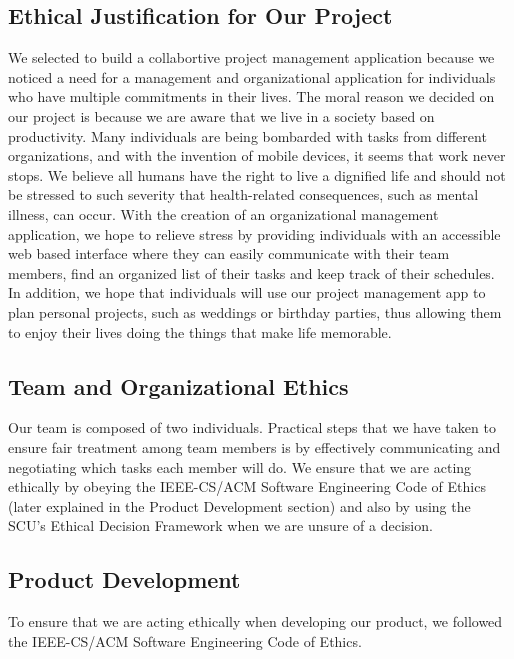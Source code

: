 \subsection{Ethical Justification for Our Project}
 We selected to build a collabortive project management application because we noticed a need for a management and organizational application for individuals who have multiple commitments in their lives. The moral reason we decided on our project is because we are aware that we live in a society based on productivity. Many individuals are being bombarded with tasks from different organizations, and with the invention of mobile devices, it seems that work never stops. We believe all humans have the right to live a dignified life and should not be stressed to such severity that health-related consequences, such as mental illness, can occur. With the creation of an organizational management application, we hope to relieve stress by providing individuals with an accessible web based interface where they can easily communicate with their team members, find an organized list of their tasks and keep track of their schedules. In addition, we hope that individuals will use our project management app to plan personal projects, such as weddings or birthday parties, thus allowing them to enjoy their lives doing the things that make life memorable. 
 \subsection{Team and Organizational Ethics}
 Our team is composed of two individuals. Practical steps that we have taken to ensure fair treatment among team members is by effectively communicating and negotiating which tasks each member will do. We ensure that we are acting ethically by obeying the IEEE-CS/ACM Software Engineering Code of Ethics (later explained in the Product Development section) and also by using the SCU’s Ethical Decision Framework when we are unsure of a decision. 
 \subsection{Product Development} 
To ensure that we are acting ethically when developing our product, we followed the  IEEE-CS/ACM Software Engineering Code of Ethics. 

